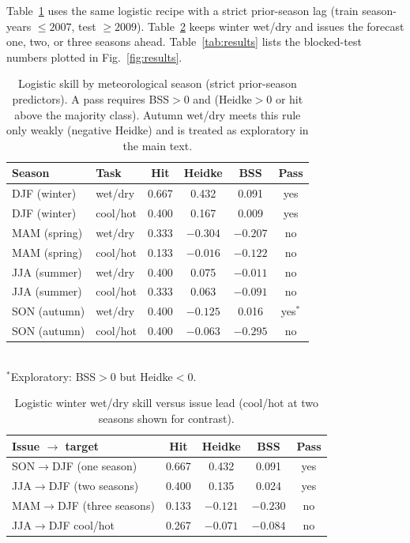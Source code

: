 \documentclass{article}
\begin{document}
Table~\ref{tab:multiseason} uses the same logistic recipe with a strict prior-season lag (train season-years \(\le 2007\), test \(\ge 2009\)). Table~\ref{tab:leads} keeps winter wet/dry and issues the forecast one, two, or three seasons ahead. Table~\ref{tab:results} lists the blocked-test numbers plotted in Fig.~\ref{fig:results}.

\begin{table}[h]
\caption{Logistic skill by meteorological season (strict prior-season predictors). A pass requires BSS$>0$ and (Heidke$>0$ or hit above the majority class). Autumn wet/dry meets this rule only weakly (negative Heidke) and is treated as exploratory in the main text.}
\label{tab:multiseason}
\centering
\setlength{\tabcolsep}{3.5pt}
\begin{tabular}{@{}llcccc@{}}
\toprule
\textbf{Season} & \textbf{Task} & \textbf{Hit} & \textbf{Heidke} & \textbf{BSS} & \textbf{Pass} \\
\midrule
DJF (winter) & wet/dry & 0.667 & 0.432 & 0.091 & yes \\
DJF (winter) & cool/hot & 0.400 & 0.167 & 0.009 & yes \\
MAM (spring) & wet/dry & 0.333 & $-0.304$ & $-0.207$ & no \\
MAM (spring) & cool/hot & 0.133 & $-0.016$ & $-0.122$ & no \\
JJA (summer) & wet/dry & 0.400 & 0.075 & $-0.011$ & no \\
JJA (summer) & cool/hot & 0.333 & 0.063 & $-0.091$ & no \\
SON (autumn) & wet/dry & 0.400 & $-0.125$ & 0.016 & yes$^{\ast}$ \\
SON (autumn) & cool/hot & 0.400 & $-0.063$ & $-0.295$ & no \\
\bottomrule
\end{tabular}\\[0.3em]
{\footnotesize $^{\ast}$Exploratory: BSS$>0$ but Heidke$<0$.}
\end{table}

\begin{table}[h]
\caption{Logistic winter wet/dry skill versus issue lead (cool/hot at two seasons shown for contrast).}
\label{tab:leads}
\centering
\setlength{\tabcolsep}{3.5pt}
\begin{tabular}{@{}lcccc@{}}
\toprule
\textbf{Issue $\rightarrow$ target} & \textbf{Hit} & \textbf{Heidke} & \textbf{BSS} & \textbf{Pass} \\
\midrule
SON$\rightarrow$DJF (one season) & 0.667 & 0.432 & 0.091 & yes \\
JJA$\rightarrow$DJF (two seasons) & 0.400 & 0.135 & 0.024 & yes \\
MAM$\rightarrow$DJF (three seasons) & 0.133 & $-0.121$ & $-0.230$ & no \\
JJA$\rightarrow$DJF cool/hot & 0.267 & $-0.071$ & $-0.084$ & no \\
\bottomrule
\end{tabular}
\end{table}
\end{document}
